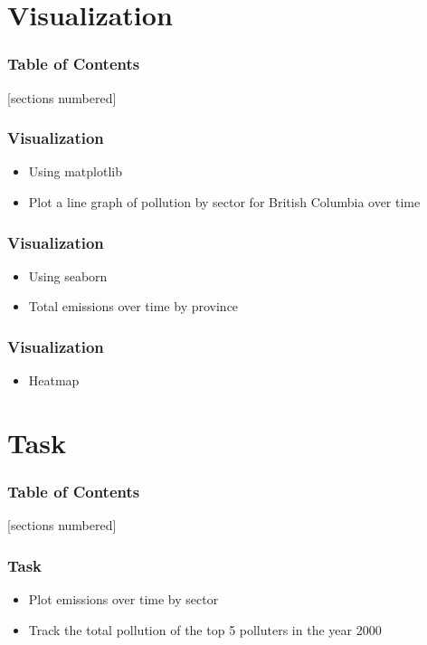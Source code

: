 \documentclass[serif, 9pt, aspectratio=32]{beamer}
\begin{document}
\section{Visualization}

\begin{frame}
    \frametitle{Table of Contents}
    [sections numbered]
    \tableofcontents[currentsection]
\end{frame}

\begin{frame}
    \centering
    \frametitle{Visualization}
    \begin{itemize}
        \setlength{\itemsep}{2em}
        \item Using matplotlib
        \item Plot a line graph of pollution by sector for British Columbia over time
    \end{itemize}
\end{frame}

\begin{frame}
    \centering
    \frametitle{Visualization}
    \begin{itemize}
        \setlength{\itemsep}{2em}
        \item Using seaborn
        \item Total emissions over time by province
    \end{itemize}
\end{frame}

\begin{frame}
    \centering
    \frametitle{Visualization}
    \begin{itemize}
        \setlength{\itemsep}{2em}
        \item Heatmap
    \end{itemize}
\end{frame}

\section{Task}

\begin{frame}
    \frametitle{Table of Contents}
    [sections numbered]
    \tableofcontents[currentsection]
\end{frame}

\begin{frame}
    \centering
    \frametitle{Task}
    \begin{itemize}
        \setlength{\itemsep}{2em}
        \item Plot emissions over time by sector
        \item Track the total pollution of the top 5 polluters in the year 2000
    \end{itemize}
\end{frame}
\end{document}

